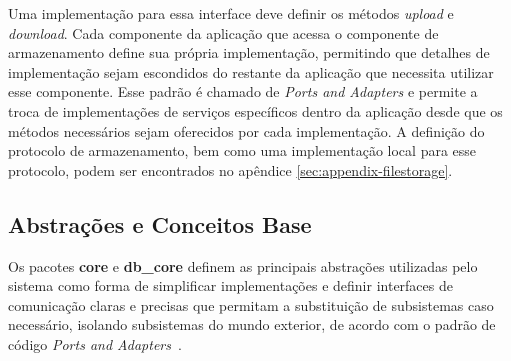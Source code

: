 Uma implementação para essa interface deve definir os métodos \textit{upload} e \textit{download}. Cada componente da aplicação que acessa o componente de armazenamento define sua própria implementação, permitindo que detalhes de implementação sejam escondidos do restante da aplicação que necessita utilizar esse componente. Esse padrão é chamado de \textit{Ports and Adapters} e permite a troca de implementações de serviços específicos dentro da aplicação desde que os métodos necessários sejam oferecidos por cada implementação. A definição do protocolo de armazenamento, bem como uma implementação local para esse protocolo, podem ser encontrados no apêndice \ref{sec:appendix-filestorage}.

\subsection{Abstrações e Conceitos Base}
Os pacotes \textbf{core} e \textbf{db\_core} definem as principais abstrações utilizadas pelo sistema como forma de simplificar implementações e definir interfaces de comunicação claras e precisas que permitam a substituição de subsistemas caso necessário, isolando subsistemas do mundo exterior, de acordo com o padrão de código \textit{Ports and Adapters}~\cite{martin2008clean}.

